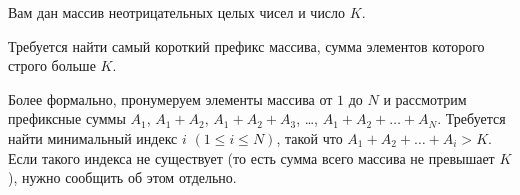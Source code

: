 Вам дан массив неотрицательных целых чисел и число $K$.

Требуется найти самый короткий префикс массива, сумма элементов которого строго больше $K$.

Более формально, пронумеруем элементы массива от $1$ до $N$ и рассмотрим префиксные суммы $A_1$, $A_1 + A_2$, $A_1 + A_2 + A_3$, \ldots, $A_1 + A_2 + \ldots + A_N$. Требуется найти минимальный индекс $i$ $(1 \le i \le N)$, такой что $A_1 + A_2 + \ldots + A_i > K$. Если такого индекса не существует (то есть сумма всего массива не превышает $K$), нужно сообщить об этом отдельно.
